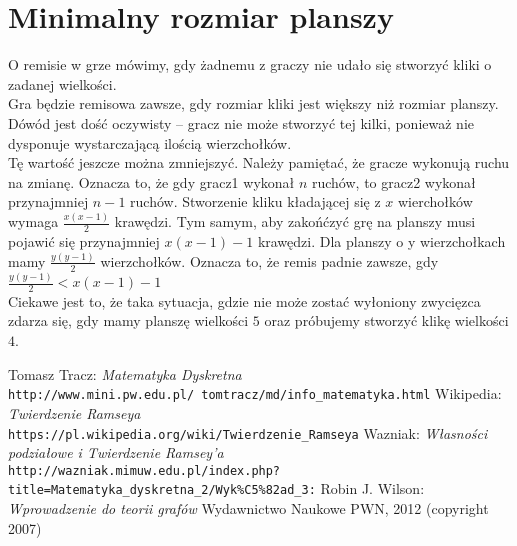 \documentclass[11pt,a4paper]{article}
\theoremstyle{definition}
\theoremstyle{remark}
\begin{document}
\section{Minimalny rozmiar planszy}
O remisie w grze mówimy, gdy żadnemu z graczy nie udało się stworzyć kliki o zadanej wielkości.\\
Gra będzie remisowa zawsze, gdy rozmiar kliki jest większy niż rozmiar planszy.
Dówód jest dość oczywisty -- gracz nie może stworzyć tej kilki,
ponieważ nie dysponuje wystarczającą ilością wierzchołków.\\
Tę wartość jeszcze można zmniejszyć.
Należy pamiętać, że gracze wykonują ruchu na zmianę. Oznacza to,
że gdy gracz1 wykonał $n$ ruchów, to gracz2 wykonał przynajmniej $n-1$ ruchów.
Stworzenie kliku kładającej się z $x$ wierchołków wymaga $\frac{x(x-1)}{2}$ krawędzi.
Tym samym, aby zakońćzyć grę na planszy musi pojawić się przynajmniej $x(x-1) - 1$ krawędzi.
Dla planszy o y wierzchołkach mamy $\frac{y(y - 1)}{2}$ wierzchołków.
Oznacza to, że remis padnie zawsze, gdy $\frac{y(y-1)}{2} < x(x-1) - 1$\\
Ciekawe jest to, że taka sytuacja, gdzie nie może zostać wyłoniony zwycięzca zdarza się,
gdy mamy planszę wielkości $5$ oraz próbujemy stworzyć klikę wielkości $4$.

\medskip

\begin{thebibliography}{9}

Tomasz Tracz: \textit{Matematyka Dyskretna}
\\\texttt{http://www.mini.pw.edu.pl/~tomtracz/md/info\_matematyka.html}
Wikipedia: \textit{Twierdzenie Ramseya}
\\\texttt{https://pl.wikipedia.org/wiki/Twierdzenie\_Ramseya}
Wazniak: \textit{Własności podziałowe i Twierdzenie Ramsey'a}
\\\texttt{http://wazniak.mimuw.edu.pl/index.php?title=Matematyka\_dyskretna\_2/Wyk\%C5\%82ad\_3:}
Robin J. Wilson: \textit{Wprowadzenie do teorii grafów}
Wydawnictwo Naukowe PWN, 2012 (copyright 2007)
\end{thebibliography}
\end{document}
